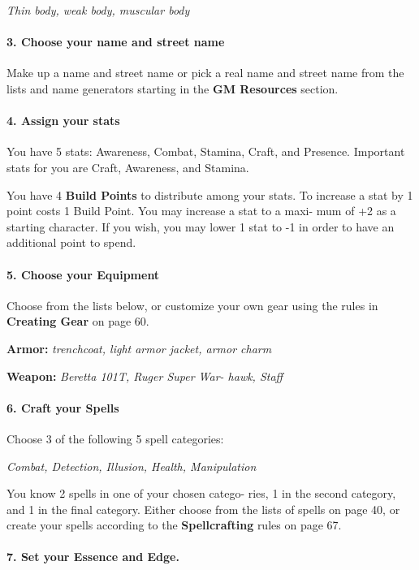 \begin{multicols}{3}
\textit{Thin body, weak body, muscular body}

\paragraph{3.  Choose your name and street name}

Make up a name and street name or pick a real
name and street name from the lists and name
generators starting in the \textbf{GM Resources} section.

\paragraph{4.  Assign your stats}

You have 5 stats: Awareness, Combat, Stamina,
Craft, and Presence. Important stats for you are
Craft, Awareness, and Stamina.

You have 4 \textbf{Build Points} to distribute among
your stats. To increase a stat by 1 point costs 1
Build Point. You may increase a stat to a maxi-
mum of +2 as a starting character. If you wish,
you may lower 1 stat to -1 in order to have an
additional point to spend.

\paragraph{5.  Choose your Equipment}

Choose from the lists below, or customize your
own gear using the rules in \textbf{Creating Gear} on
page 60.

\textbf{Armor:} \textit{trenchcoat, light armor jacket, armor
charm}

\textbf{Weapon:} \textit{Beretta 101T, Ruger Super War-
hawk, Staff}

\paragraph{6.  Craft your Spells}

Choose 3 of the following 5 spell categories:

\textit{Combat, Detection, Illusion, Health, Manipulation}

You know 2 spells in one of your chosen catego-
ries, 1 in the second category, and 1 in the final
category. Either choose from the lists of spells on
page 40, or create your spells according to the
\textbf{Spellcrafting} rules on page 67.

\paragraph{7.  Set your Essence and Edge.}


\end{multicols}
